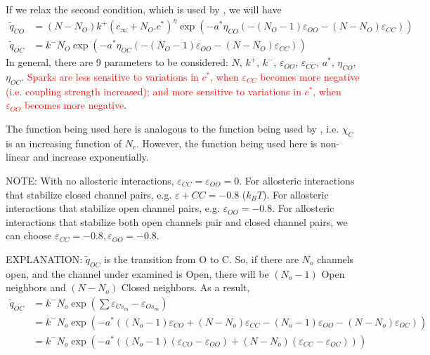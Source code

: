 If we relax the second condition, which is used by \citep{williams2008mclc}, we
will have
\small
\begin{equation}
  \label{eq:1153}
  \begin{split}
    \tilde{q}_{CO} &= (N-N_O)k^+(c_\infty + N_O.c^*)^\eta
    \exp\left(-a^*\eta_{CO}(-(N_O-1)\varepsilon_{OO}-(N-N_O)
    \varepsilon_{CC})\right)
    \\
  \tilde{q}_{OC} &= k^- N_O
  \exp\left(-a^*\eta_{OC}(-(N_O-1)\varepsilon_{OO}-(N-N_O)
    \varepsilon_{CC})\right)
  \end{split}
\end{equation}
\normalsize
In general, there are 9 parameters to be considered: $N$, $k^+$, $k^-$,
$\varepsilon_{OO}$, $\varepsilon_{CC}$, $a^*$, $\eta_{CO}$, $\eta_{OC}$.
\textcolor{red}{Sparks are less sensitive to variations in $c^*$, when
$\varepsilon_{CC}$ becomes more negative (i.e. coupling strength increased); and
more sensitive to variations in $c^*$, when $\varepsilon_{OO}$ becomes more
negative}.

The function being used here is analogous to the function being used by
\citep{sobie2002tcas}, i.e. $\chi_{C}$ is an increasing function of $N_c$.
However, the function being used here is non-linear and increase exponentially.

NOTE: With no allosteric interactions, $\varepsilon_{CC}=\varepsilon_{OO}=0$. For
allosteric interactions that stabilize closed channel pairs, e.g.
$\varepsilon+{CC}=-0.8$ ($k_BT$). For allosteric interactions that stabilize open
channel pairs, e.g. $\varepsilon_{OO}=-0.8$. For allosteric interactions that
stabilize both open channels pair and closed channel pairs, we can choose
$\varepsilon_{CC}=-0.8, \varepsilon_{OO}=-0.8$.

\begin{framed}
EXPLANATION: $\tilde{q}_{OC}$ is the transition from O to C. So, if there are
$N_o$ channels open, and the channel under examined is Open, there will be
$(N_o-1)$ Open neighbors and $(N-N_o)$ Closed neighbors. As a result,
\small
\begin{equation*}
\begin{split}
\tilde{q}_{OC} &=k^-N_o \exp \left(\sum \varepsilon_{Cs_m} -
\varepsilon_{Os_m}\right) \\
  &= k^-N_o \exp\left(-a^*\left(
(N_o-1) \varepsilon_{CO} +
(N-N_o)\varepsilon_{CC} - (N_o-1)\varepsilon_{OO} - (N-N_o)\varepsilon_{OC}
\right) \right)  \\
  &= k^-N_o \exp\left(-a^*\left(
(N_o-1) (\varepsilon_{CO} - \varepsilon_{OO}) +
(N-N_o) (\varepsilon_{CC} - \varepsilon_{OC})
\right) \right)  \\
\end{split}
\end{equation*}
\normalsize
\end{framed}
%


